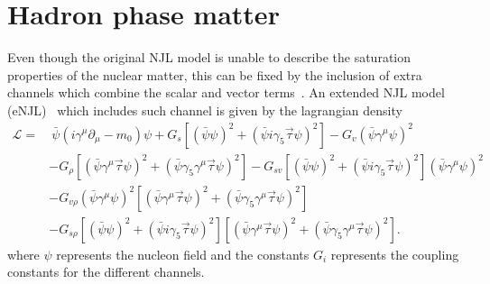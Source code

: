 \documentclass{ws-ijmpcs}
\begin{document}
\section{Hadron phase matter}

Even though the original NJL model is unable to describe the saturation properties of the nuclear matter, this can be fixed by the inclusion of extra channels which combine the scalar and vector terms~\cite{Koch1987}. An extended NJL model (eNJL)~\cite{Pais2016} which includes such channel is given by the lagrangian density
\begin{equation}\label{Eq:Lagrangiana_eNLJ_Pais}
\begin{split}
	\mathcal{L} =&~ \bar{\psi}(i\gamma^\mu\partial_\mu - m_0)\psi + G_s[(\bar{\psi}\psi)^2 + (\bar{\psi}i\gamma_5\vec{\tau}\psi)^2] - G_v(\bar{\psi}\gamma^\mu\psi)^2 \\
	& - G_\rho[(\bar{\psi}\gamma^\mu\vec{\tau}\psi)^2 + (\bar{\psi}\gamma_5\gamma^\mu\vec{\tau}\psi)^2] - G_{sv}[(\bar{\psi}\psi)^2 + (\bar{\psi}i\gamma_5\vec{\tau}\psi)^2](\bar{\psi}\gamma^\mu\psi)^2 \\
	& - G_{v\rho}(\bar{\psi}\gamma^\mu\psi)^2[(\bar{\psi}\gamma^\mu\vec{\tau}\psi)^2 + (\bar{\psi}\gamma_5\gamma^\mu\vec{\tau}\psi)^2] \\
	& - G_{s\rho} [(\bar{\psi}\psi)^2 + (\bar{\psi}i\gamma_5\vec{\tau}\psi)^2][(\bar{\psi}\gamma^\mu\vec{\tau}\psi)^2 + (\bar{\psi}\gamma_5\gamma^\mu\vec{\tau}\psi)^2].
\end{split}
\end{equation}
%
where $\psi$ represents the nucleon field and the constants $G_i$ represents the coupling constants for the different channels.
%
\end{document}
